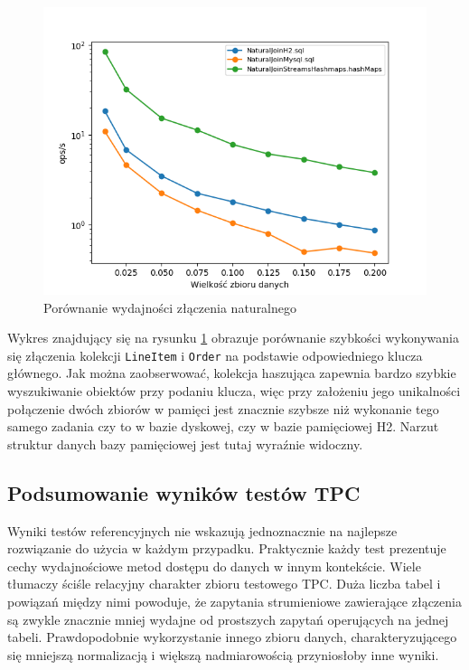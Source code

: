 \documentclass[12pt,twoside,openright]{extarticle}
\begin{document}
\newpage
\begin{figure}[H]
    \centering
    \includegraphics[width=13cm]{plots/NaturalJoin}
    \caption{Porównanie wydajności złączenia naturalnego}
    \label{fig:naturaljoingraph}
\end{figure}

    Wykres znajdujący się na rysunku \ref{fig:naturaljoingraph} obrazuje porównanie szybkości wykonywania się złączenia kolekcji \texttt{LineItem} i \texttt{Order} na podstawie odpowiedniego klucza głównego. Jak można zaobserwować, kolekcja haszująca zapewnia bardzo szybkie wyszukiwanie obiektów przy podaniu klucza, więc przy założeniu jego unikalności połączenie dwóch zbiorów w pamięci jest znacznie szybsze niż wykonanie tego samego zadania czy to w bazie dyskowej, czy w bazie pamięciowej H2. Narzut struktur danych bazy pamięciowej jest tutaj wyraźnie widoczny.

\subsection{Podsumowanie wyników testów TPC}

    Wyniki testów referencyjnych nie wskazują jednoznacznie na najlepsze rozwiązanie do użycia w każdym przypadku. Praktycznie każdy test prezentuje cechy wydajnościowe metod dostępu do danych w innym kontekście. Wiele tłumaczy ściśle relacyjny charakter zbioru testowego TPC. Duża liczba tabel i powiązań między nimi powoduje, że zapytania strumieniowe zawierające złączenia są zwykle znacznie mniej wydajne od prostszych zapytań operujących na jednej tabeli. Prawdopodobnie wykorzystanie innego zbioru danych, charakteryzującego się mniejszą normalizacją i większą nadmiarowością przyniosłoby inne wyniki. 
\end{document}
